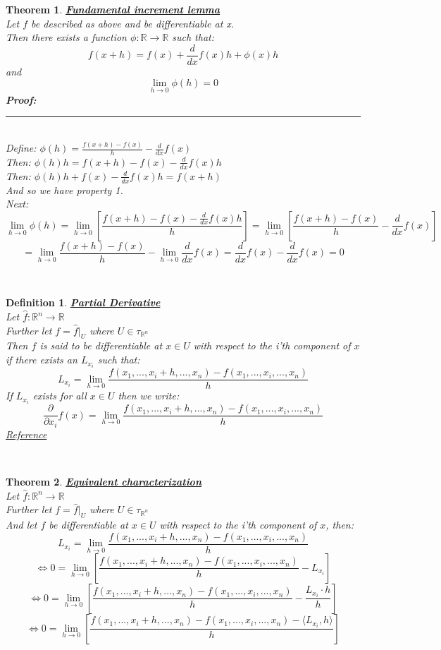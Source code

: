 \documentclass[12pt]{extarticle}
\theoremstyle{plain}
\newtheorem{thm}{Theorem}[section]
\theoremstyle{plain}
\theoremstyle{plain}
\theoremstyle{Definition}
\newtheorem{def.}{Definition}[section]
\theoremstyle{Definition}
\theoremstyle{plain}
\theoremstyle{plain}
\newcommand{\cut}[0]{\noindent\framebox[\linewidth]{\rule{\linewidth}{2pt}}\\}
\newcommand{\prof}[0]{	\noindent \textbf{Proof:} \rule{500pt}{2pt} \\ }
\begin{document}
\begin{thm} \underline{\textbf{Fundamental increment lemma}} \\ 
	Let $f$ be described as above and be differentiable at x. \\ 
	Then there exists a function $\phi : \mathbb{R} \to \mathbb{R}$ such that: \\ 
	$$f(x + h) = f(x) + \frac{d}{dx} f(x)h + \phi(x)h$$
	and 
	$$\lim_{h \to 0} \phi(h) = 0$$ 
	\prof 
	Define: $\phi(h) = \frac{f(x+h) - f(x)}{h} - \frac{d}{dx} f(x)$ \\ 
	Then: $\phi(h)h = f(x+h) - f(x) - \frac{d}{dx} f(x)h$ \\ 
	Then: $\phi(h)h + f(x) - \frac{d}{dx} f(x)h = f(x + h)$ \\ 
	And so we have property 1. \\ 
	Next: \\ 
	$$\lim_{h \to 0} \phi(h) = \lim_{h \to 0} \left[\frac{f(x+h) - f(x) - \frac{d}{dx} f(x)h}{h}\right] = \lim_{h \to 0} \left[\frac{f(x+h) - f(x)}{h} - \frac{d}{dx} f(x)\right] $$
	$$= \lim_{h \to 0}\frac{f(x+h) - f(x)}{h} - \lim_{h \to 0} \frac{d}{dx} f(x) = \frac{d}{dx} f(x) - \frac{d}{dx} f(x) = 0$$
\end{thm}
\cut
\begin{def.} \underline{\textbf{Partial Derivative}} \\
	Let $\hat{f} : \mathbb{R}^n \to \mathbb{R}$ \\
	Further let $f = \hat{f}|_U$ where $U \in \tau_{\mathbb{R}^n}$ \\ 
	Then $f$ is said to be differentiable at $x \in U$ with respect to the i'th component of $x$ if there exists an $L_{x_i}$ such that: \\  
	$$L_{x_i} = \lim_{h \to 0} \frac{f(x_1,...,x_i + h,...,x_n) - f(x_1,...,x_i,...,x_n)}{h}$$
	If $L_{x_i}$ exists for all $x \in U$ then we write: \\ 
	$$\frac{\partial}{\partial x_i} f(x) = \lim_{h \to 0} \frac{f(x_1,...,x_i + h,...,x_n) - f(x_1,...,x_i,...,x_n)}{h}$$ 
	\href{https://en.wikipedia.org/wiki/Partial_derivative}{Reference}
\end{def.}
\cut
\begin{thm} \underline{\textbf{Equivalent characterization}} \\ 
	Let $\hat{f} : \mathbb{R}^n \to \mathbb{R}$ \\
	Further let $f = \hat{f}|_U$ where $U \in \tau_{\mathbb{R}^n}$ \\ 
	And let $f$ be differentiable at $x \in U$ with respect to the i'th component of $x$, then: 
	$$L_{x_i} = \lim_{h \to 0} \frac{f(x_1,...,x_i + h,...,x_n) - f(x_1,...,x_i,...,x_n)}{h}$$
	$$\Leftrightarrow 0 = \lim_{h \to 0} \left[\frac{f(x_1,...,x_i + h,...,x_n) - f(x_1,...,x_i,...,x_n)}{h} - L_{x_i}\right]$$
	$$\Leftrightarrow 0 = \lim_{h \to 0} \left[\frac{f(x_1,...,x_i + h,...,x_n) - f(x_1,...,x_i,...,x_n)}{h} - \frac{L_{x_i} \cdot h}{h}\right]$$
	$$\Leftrightarrow 0 = \lim_{h \to 0} \left[\frac{f(x_1,...,x_i + h,...,x_n) - f(x_1,...,x_i,...,x_n) - \langle L_{x_i} , h \rangle}{h}  \right]$$	
\end{thm}
\end{document}
